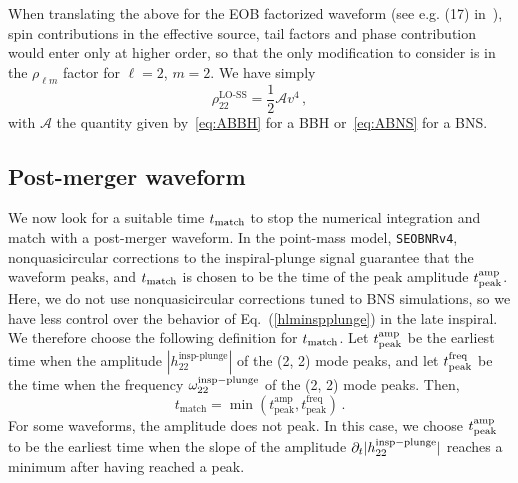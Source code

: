 \documentclass[prd,aps,letter,twocolumn,floatfix,notitlepage,nofootinbib]{revtex4-1}
\newcommand{\be}{\begin{equation}}
\newcommand{\ee}{\end{equation}}
\begin{document}
When translating the above for the EOB factorized waveform (see e.g. (17) in~\cite{Taracchini:2012ig}), spin contributions in the effective source, tail factors and phase contribution would enter only at higher order, so that the only modification to consider is in the $\rho_{\ell m}$ factor for $\ell = 2$, $m = 2$. We have simply
\be\label{eq:rho22}
	\rho_{22}^{\textrm{LO-SS}} = \frac{1}{2}\mathcal{A} v^{4} \,,
\ee
with $\mathcal{A}$ the quantity given by~\eqref{eq:ABBH} for a BBH or~\eqref{eq:ABNS} for a BNS. 

\subsection{Post-merger waveform}

We now look for a suitable time $t_{\rm match}$ to stop the numerical integration and match with a post-merger waveform. In the point-mass model, \texttt{SEOBNRv4}, nonquasicircular corrections to the inspiral-plunge signal guarantee that the waveform peaks, and $t_{\rm match}$ is chosen to be the time of the peak amplitude $t_{\rm peak}^{\rm amp}$. Here, we do not use nonquasicircular corrections tuned to BNS simulations, so we have less control over the behavior of Eq.~(\ref{hlminspplunge}) in the late inspiral. We therefore choose the following definition for $t_{\rm match}$. Let $t_{\rm peak}^{\rm amp}$ be the earliest time when the amplitude $|h_{22}^{\textrm{insp-plunge}}|$ of the (2, 2) mode peaks, and let $t_{\rm peak}^{\rm freq}$ be the time when the frequency $\omega_{22}^{\rm insp-plunge}$ of the (2, 2) mode peaks. Then,
\begin{equation}
t_{\textrm{match}} = \min \left(t_{\textrm{peak}}^{\textrm{amp}},t_{\textrm{peak}}^{\textrm{freq}}\right)\,.\label{tmatch}
\end{equation}
For some waveforms, the amplitude does not peak. In this case, we choose $t_{\rm peak}^{\rm amp}$ to be the earliest time when the slope of the amplitude $\partial_t |h_{22}^{\rm insp-plunge}|$ reaches a minimum after having reached a peak.

\end{document}
